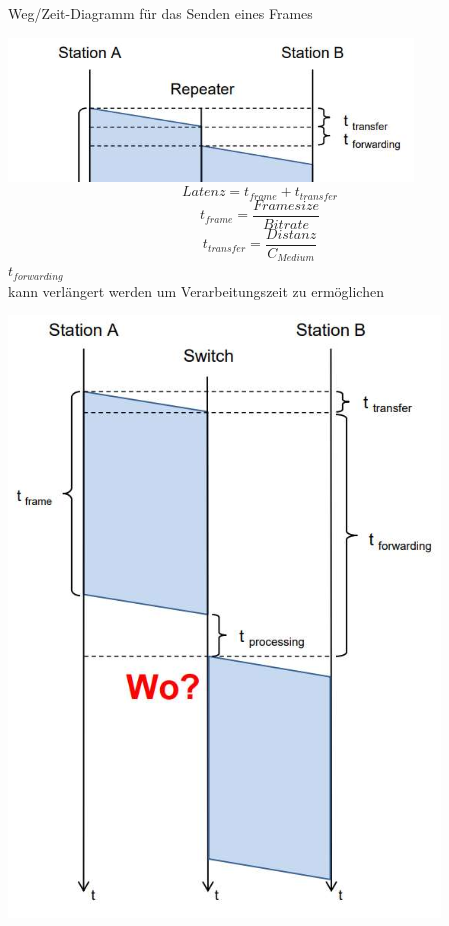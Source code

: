\begin{KR}{Weg/Zeit-Diagramm für das Senden eines Frames}\\
    \begin{minipage}{0.5\linewidth}
        \includegraphics[width=1\linewidth]{images/zeit_frame_hub.png} 
        $$Latenz = t_{frame} + t_{transfer}$$
        $$t_{frame} = \frac{Framesize}{Bitrate}$$
        $$t_{transfer} = \frac{Distanz}{C_{Medium}}$$
        $t_{forwarding}$ \\kann verlängert werden um Verarbeitungszeit zu ermöglichen
    \end{minipage}
    \begin{minipage}{0.5\linewidth}
        \includegraphics[width=1\linewidth]{images/weg_zeit_senden_frame.png}
    \end{minipage}
\end{KR}

